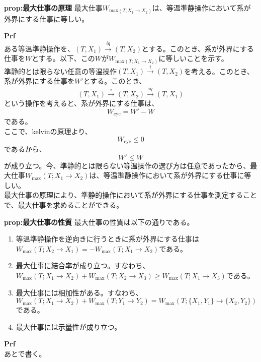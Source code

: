 \documentclass[a4paper,11pt]{jsarticle}
\begin{document}
\begin{itembox}[l]{\textbf{prop:最大仕事の原理}}
    最大仕事$W_{\text{max}(T;X_1\rightarrow X_2)}$は、等温準静操作において系が外界にする仕事に等しい。
\end{itembox}
\textbf{Prf}\\
ある等温準静操作を、$(T,X_1) \xrightarrow{iq} (T,X_2)$とする。このとき、系が外界にする仕事を$W$とする。以下、この$W$が$W_{\text{max}(T;X_1\rightarrow X_2)}$に等しいことを示す。\\
準静的とは限らない任意の等温操作$(T,X_1) \xrightarrow{i} (T,X_2)$を考える。このとき、系が外界にする仕事を$W'$とする。このとき、
\begin{equation}
    (T,X_1) \xrightarrow{i} (T,X_2) \xrightarrow{iq} (T,X_1)
\end{equation}
という操作を考えると、系が外界にする仕事は、
\begin{equation}
    W_{\text{cyc}} = W'-W
\end{equation}
である。\\
ここで、kelvinの原理より、
\begin{equation}
    W_{\text{cyc}} \leq 0
\end{equation}
であるから、
\begin{equation}
    W' \leq W
\end{equation}
が成り立つ。今、準静的とは限らない等温操作の選び方は任意であったから、最大仕事$W_{\text{max}}(T;X_1\rightarrow X_2)$は、等温準静操作において系が外界にする仕事に等しい。\\

最大仕事の原理により、準静的操作において系が外界にする仕事を測定することで、最大仕事を求めることができる。\\

\begin{itembox}[l]{\textbf{prop:最大仕事の性質}}
    最大仕事の性質は以下の通りである。
    \begin{enumerate}
        \item 等温準静操作を逆向きに行うときに系が外界にする仕事は$W_{\text{max}}(T;X_2\rightarrow X_1)=-W_{\text{max}}(T;X_1\rightarrow X_2)$である。
        \item 最大仕事に結合率が成り立つ。すなわち、$W_{\text{max}}(T;X_1\rightarrow X_2)+W_{\text{max}}(T;X_2\rightarrow X_3) \geq W_{\text{max}}(T;X_1\rightarrow X_3)$である。
        \item 最大仕事には相加性がある。すなわち、$W_{\text{max}}(T;X_1\rightarrow X_2)+W_{\text{max}}(T;Y_1\rightarrow Y_2) = W_{\text{max}}(T;\{X_1,Y_1\}\rightarrow \{X_2,Y_2\})$である。
        \item 最大仕事には示量性が成り立つ。
    \end{enumerate}
\end{itembox}
\textbf{Prf}\\
あとで書く。\\
\end{document}
